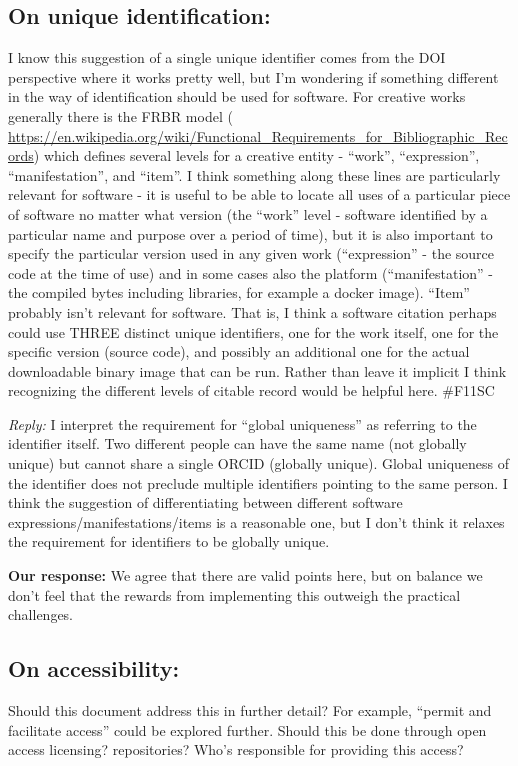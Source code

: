 \documentclass[12pt, oneside]{amsart}
\begin{document}
\subsection{On unique identification:} I know this suggestion of a single unique identifier comes from the DOI perspective where it works pretty well, but I'm wondering if something different in the way of identification should be used for software. For creative works generally there is the FRBR model ( \url{https://en.wikipedia.org/wiki/Functional_Requirements_for_Bibliographic_Records}) which defines several levels for a creative entity - ``work'', ``expression'', ``manifestation'', and ``item''. I think something along these lines are particularly relevant for software - it is useful to be able to locate all uses of a particular piece of software no matter what version (the ``work'' level - software identified by a particular name and purpose over a period of time), but it is also important to specify the particular version used in any given work (``expression'' - the source code at the time of use) and in some cases also the platform (``manifestation'' - the compiled bytes including libraries, for example a docker image). ``Item'' probably isn't relevant for software. That is, I think a software citation perhaps could use THREE distinct unique identifiers, one for the work itself, one for the specific version (source code), and possibly an additional one for the actual downloadable binary image that can be run. Rather than leave it implicit I think recognizing the different levels of citable record would be helpful here. \#{F11SC}

\emph{Reply:} I interpret the requirement for ``global uniqueness'' as referring to the identifier itself. Two different people can have the same name (not globally unique) but cannot share a single ORCID (globally unique). Global uniqueness of the identifier does not preclude multiple identifiers pointing to the same person. I think the suggestion of differentiating between different software expressions\slash manifestations\slash items is a reasonable one, but I don't think it relaxes the requirement for identifiers to be globally unique.

\textbf{Our response:}
We agree that there are valid points here, but on balance we don't feel that the rewards from implementing this outweigh the practical challenges.

\subsection{On accessibility:} Should this document address this in further detail? For example, ``permit and facilitate access'' could be explored further. Should this be done through open access licensing? repositories? Who's responsible for providing this access?
\end{document}
